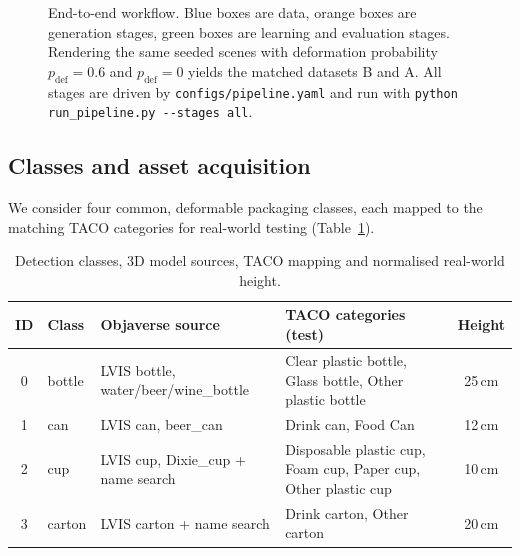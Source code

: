 \documentclass[11pt,a4paper]{article}
\newcommand{\code}[1]{\texttt{\small #1}}
\begin{document}
\begin{figure}[H]
{}
\caption{End-to-end workflow. Blue boxes are data, orange boxes are generation stages, green
boxes are learning and evaluation stages. Rendering the same seeded scenes with deformation
probability $p_\mathrm{def}=0.6$ and $p_\mathrm{def}=0$ yields the matched datasets B and A. All
stages are driven by \code{configs/pipeline.yaml} and run with
\code{python run\_pipeline.py -{}-stages all}.}
\label{fig:pipeline}
\end{figure}

\subsection{Classes and asset acquisition}

We consider four common, deformable packaging classes, each mapped to the matching TACO
categories for real-world testing (Table~\ref{tab:classes}).

\begin{table}[H]
\centering
\small
\begin{tabularx}{\textwidth}{c l X X c}
\toprule
ID & Class & Objaverse source & TACO categories (test) & Height \\
\midrule
0 & bottle & LVIS bottle, water/beer/wine\_bottle & Clear plastic bottle, Glass bottle, Other plastic bottle & 25\,cm \\
1 & can & LVIS can, beer\_can & Drink can, Food Can & 12\,cm \\
2 & cup & LVIS cup, Dixie\_cup + name search & Disposable plastic cup, Foam cup, Paper cup, Other plastic cup & 10\,cm \\
3 & carton & LVIS carton + name search & Drink carton, Other carton & 20\,cm \\
\bottomrule
\end{tabularx}
\caption{Detection classes, 3D model sources, TACO mapping and normalised real-world height.}
\label{tab:classes}
\end{table}
\end{document}
